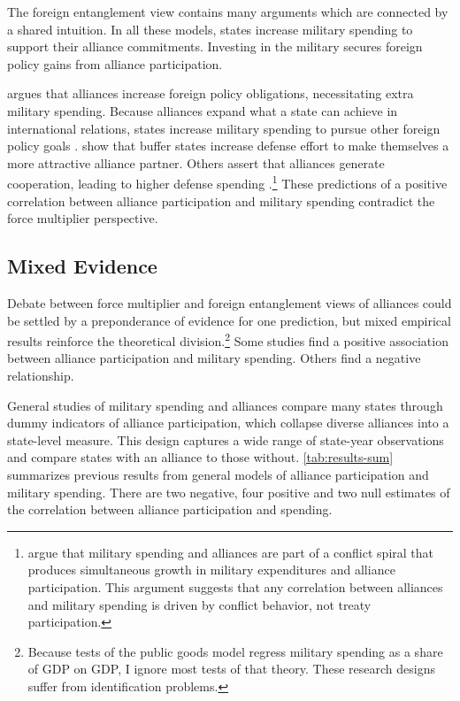 \documentclass[12pt]{article}
\begin{document}
The foreign entanglement view contains many arguments which are connected by a shared intuition. 
In all these models, states increase military spending to support their alliance commitments. 
Investing in the military secures foreign policy gains from alliance participation. 


\citet{Diehl1994} argues that alliances increase foreign policy obligations, necessitating extra military spending. 
Because alliances expand what a state can achieve in international relations, states increase military spending to pursue other foreign policy goals \citep{MorganPalmer2006}. 
\citet{Horowitzetal2017} show that buffer states increase defense effort to make themselves a more attractive alliance partner. 
Others assert that alliances generate cooperation, leading to higher defense spending \citep{Palmer1990, QuirozFlores2011}.\footnote{
\citet{SeneseVasquez2008} argue that military spending and alliances are part of a conflict spiral that produces simultaneous growth in military expenditures and alliance participation. 
This argument suggests that any correlation between alliances and military spending is driven by conflict behavior, not treaty participation.
}
These predictions of a positive correlation between alliance participation and military spending contradict the force multiplier perspective. 


\subsection{Mixed Evidence} 


Debate between force multiplier and foreign entanglement views of alliances could be settled by a preponderance of evidence for one prediction, but mixed empirical results reinforce the theoretical division.\footnote{
Because tests of the public goods model regress military spending as a share of GDP on GDP, I ignore most tests of that theory. These research designs suffer from identification problems.}
Some studies find a positive association between alliance participation and military spending. 
Others find a negative relationship. 


General studies of military spending and alliances compare many states through dummy indicators of alliance participation, which collapse diverse alliances into a state-level measure. 
This design captures a wide range of state-year observations and compare states with an alliance to those without.
\autoref{tab:results-sum} summarizes previous results from general models of alliance participation and military spending. 
There are two negative, four positive and two null estimates of the correlation between alliance participation and spending. 
\end{document}
